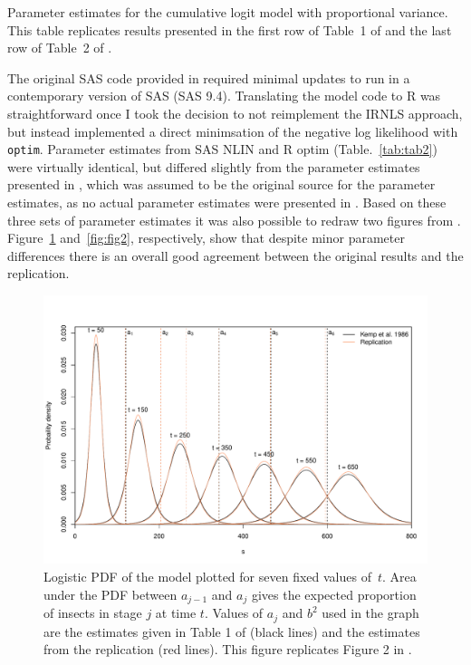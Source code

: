 \begin{table}
  \small
    \centering
    \caption{Parameter estimates for the cumulative logit model with proportional variance. 
    This table replicates results presented in the first row of Table~1 of  \citep{kemp1986stochastic} and the last row of Table~2 of \citep{candy1991modeling}.}
  
  \label{tab:tab2}
\end{table}

The original SAS code provided in \citep{dennis1986stochastic} required minimal updates to run in a contemporary version of SAS (SAS 9.4). 
Translating the model code to R was straightforward once I took the decision to not reimplement the IRNLS approach, but instead implemented a direct minimsation of the negative log likelihood with \verb+optim+.  
Parameter estimates from SAS NLIN and R optim (Table.~\ref{tab:tab2}) were virtually identical, but differed slightly from the parameter estimates presented in \citep{kemp1986stochastic}, which was assumed to be the original source for the parameter estimates, as no actual parameter estimates were presented in \citep{dennis1986stochastic}. 
Based on these three sets of parameter estimates it was also possible to redraw two figures from \citep{dennis1986stochastic}. 
Figure~\ref{fig:fig1} and~\ref{fig:fig2}, respectively,  show that despite minor parameter differences there is an overall good agreement between the original results and the replication.
 
\begin{figure}
  \centering
  \includegraphics[width=\textwidth]{../figures/dennis_fig2.pdf}
  \caption{Logistic PDF of the \citet{dennis1986stochastic} model plotted for seven fixed values of~$t$. 
  Area under the PDF between $a_{j-1}$ and $a_j$ gives the expected proportion of insects in stage $j$ at time $t$. 
  Values of $a_j$ and $b^2$ used in the graph are the estimates given in Table 1 of \citep{kemp1986stochastic} (black lines) and the estimates from the replication (red lines). 
  This figure replicates Figure 2 in \citep{dennis1986stochastic}.}
  \label{fig:fig1}
\end{figure}


